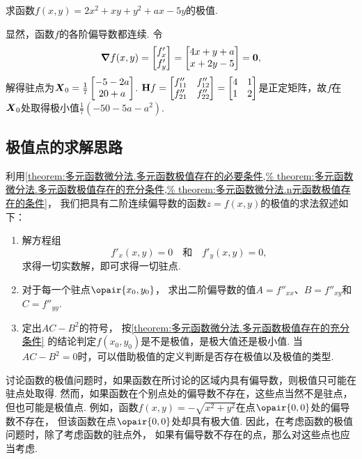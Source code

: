 \begin{example}
求函数\(f(x,y) = 2x^2 + xy + y^2 + ax - 5y\)的极值.
\begin{solution}
显然，函数\(f\)的各阶偏导数都连续.
令\[
\grad f(x,y) = \begin{bmatrix} f'_x \\ f'_y \end{bmatrix}
= \begin{bmatrix} 4x+y+a \\ x+2y-5 \end{bmatrix} = \boldsymbol{0},
\]解得驻点为\(\boldsymbol{X}_{0} = \frac{1}{7} \begin{bmatrix} -5-2a \\ 20+a \end{bmatrix}\).
\(\boldsymbol{\operatorname{H}} f = \begin{bmatrix}
f''_{11} & f''_{12} \\
f''_{21} & f''_{22}
\end{bmatrix} = \begin{bmatrix}
4 & 1 \\
1 & 2
\end{bmatrix}\)是正定矩阵，故\(f\)在\(\boldsymbol{X}_{0}\)处取得极小值\(\frac{1}{7} (-50-5a-a^2)\).
\end{solution}
\end{example}

\subsection{极值点的求解思路}
利用\cref{theorem:多元函数微分法.多元函数极值存在的必要条件,%
theorem:多元函数微分法.多元函数极值存在的充分条件,%
theorem:多元函数微分法.n元函数极值存在的条件}，
我们把具有二阶连续偏导数的函数\(z = f(x,y)\)的极值的求法叙述如下：
\begin{enumerate}
	\item 解方程组\[
		f'_x(x,y) = 0
		\quad\text{和}\quad
		f'_y(x,y) = 0,
	\]求得一切实数解，即可求得一切驻点.

	\item 对于每一个驻点\(\opair{x_0,y_0}\)，
	求出二阶偏导数的值\(A=f''_{xx}\)、\(B=f''_{xy}\)和\(C=f''_{yy}\).

	\item 定出\(AC-B^2\)的符号，
	按\cref{theorem:多元函数微分法.多元函数极值存在的充分条件}
	的结论判定\(f(x_0,y_0)\)是不是极值，是极大值还是极小值.
	当\(AC-B^2=0\)时，可以借助极值的定义判断是否存在极值以及极值的类型.
\end{enumerate}

讨论函数的极值问题时，如果函数在所讨论的区域内具有偏导数，则极值只可能在驻点处取得.
然而，如果函数在个别点处的偏导数不存在，这些点当然不是驻点，但也可能是极值点.
例如，函数\(f(x,y) = -\sqrt{x^2+y^2}\)在点\(\opair{0,0}\)处的偏导数不存在，
但该函数在点\(\opair{0,0}\)处却具有极大值.
因此，在考虑函数的极值问题时，除了考虑函数的驻点外，
如果有偏导数不存在的点，那么对这些点也应当考虑.

